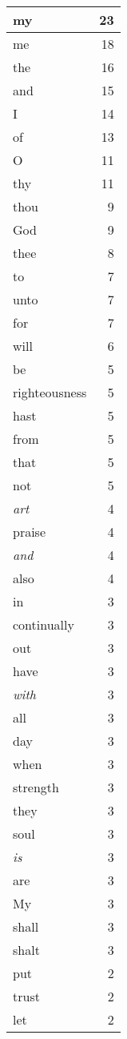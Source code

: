 \begin{center}
\begin{longtable}{l|r}
\hline \hline
\endlastfoot
my & 23 \\ \hline
me & 18 \\ \hline
the & 16 \\ \hline
and & 15 \\ \hline
I & 14 \\ \hline
of & 13 \\ \hline
O & 11 \\ \hline
thy & 11 \\ \hline
thou & 9 \\ \hline
God & 9 \\ \hline
thee & 8 \\ \hline
to & 7 \\ \hline
unto & 7 \\ \hline
for & 7 \\ \hline
will & 6 \\ \hline
be & 5 \\ \hline
righteousness & 5 \\ \hline
hast & 5 \\ \hline
from & 5 \\ \hline
that & 5 \\ \hline
not & 5 \\ \hline
\emph{art} & 4 \\ \hline
praise & 4 \\ \hline
\emph{and} & 4 \\ \hline
also & 4 \\ \hline
in & 3 \\ \hline
continually & 3 \\ \hline
out & 3 \\ \hline
have & 3 \\ \hline
\emph{with} & 3 \\ \hline
all & 3 \\ \hline
day & 3 \\ \hline
when & 3 \\ \hline
strength & 3 \\ \hline
they & 3 \\ \hline
soul & 3 \\ \hline
\emph{is} & 3 \\ \hline
are & 3 \\ \hline
My & 3 \\ \hline
shall & 3 \\ \hline
shalt & 3 \\ \hline
put & 2 \\ \hline
trust & 2 \\ \hline
let & 2 \\ \hline

\end{longtable}
\end{center}
